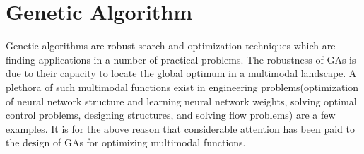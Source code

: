 \documentclass[a4paper, 12pt]{article}
\begin{document}
\section{Genetic Algorithm}
Genetic algorithms are robust search and optimization techniques which are finding applications in a number of practical problems. The robustness of GAs is due to their capacity to locate the global optimum in a multimodal landscape. A plethora of such multimodal functions exist in engineering problems(optimization of neural network structure and learning neural network weights, solving optimal control problems, designing structures, and solving flow problems) are a few examples. It is for the above reason that considerable attention has been paid to the design of GAs for optimizing multimodal functions.\\ \par
\noindent
\end{document}

